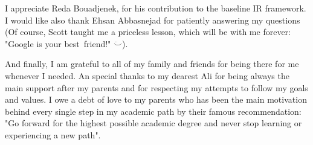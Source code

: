 I appreciate Reda Bouadjenek, for his contribution to the baseline IR framework. I would like also thank Ehsan Abbasnejad for patiently answering my questions (Of course, Scott taught me a priceless lesson, which will be with me forever: "Google is your best~friend!" $\ddot\smile$).

And finally, I am grateful to all of my family and friends for being there for me whenever I needed. An special thanks to my dearest Ali for being always the main support after my parents and for respecting my attempts to follow my goals and values. I owe a debt of love to my parents who has been the main motivation behind every single step in my academic path by their famous recommendation: "Go forward for the highest possible academic degree and never stop learning or experiencing a new path". 